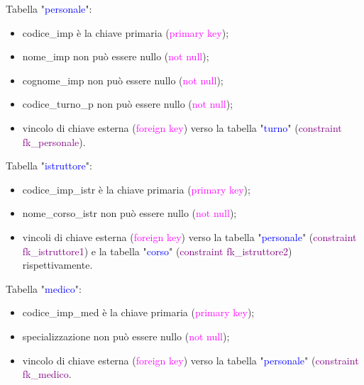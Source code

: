 \documentclass{article}
\begin{document}
    \begin{flushleft}
        Tabella "\textcolor{blue}{personale}": \\
        \begin{itemize}
            \item codice\_imp è la chiave primaria (\textcolor{magenta}{primary key}); \\
            \item nome\_imp non può essere nullo (\textcolor{magenta}{not null}); \\
            \item cognome\_imp non può essere nullo (\textcolor{magenta}{not null}); \\
            \item codice\_turno\_p non può essere nullo (\textcolor{magenta}{not null}); \\
            \item vincolo di chiave esterna (\textcolor{magenta}{foreign key}) verso la tabella "\textcolor{blue}{turno}" (\textcolor{purple}{constraint fk\_personale}).
        \end{itemize}        
    \end{flushleft}

    \begin{flushleft}
        Tabella "\textcolor{blue}{istruttore}": \\
        \begin{itemize}
            \item codice\_imp\_istr è la chiave primaria (\textcolor{magenta}{primary key}); \\
            \item nome\_corso\_istr non può essere nullo (\textcolor{magenta}{not null}); \\
            \item vincoli di chiave esterna (\textcolor{magenta}{foreign key}) verso la tabella "\textcolor{blue}{personale}" (\textcolor{purple}{constraint fk\_istruttore1}) e la tabella "\textcolor{blue}{corso}" (\textcolor{purple}{constraint fk\_istruttore2}) rispettivamente. \\
        \end{itemize}        
    \end{flushleft}

    \begin{flushleft}
        Tabella "\textcolor{blue}{medico}": \\
        \begin{itemize}
            \item codice\_imp\_med è la chiave primaria (\textcolor{magenta}{primary key}); \\
            \item specializzazione non può essere nullo (\textcolor{magenta}{not null}); \\
            \item vincolo di chiave esterna (\textcolor{magenta}{foreign key}) verso la tabella "\textcolor{blue}{personale}" (\textcolor{purple}{constraint fk\_medico}. \\
        \end{itemize}        
    \end{flushleft}
\end{document}
